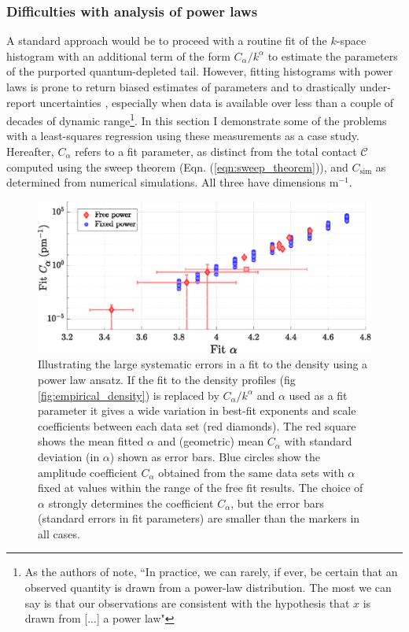 \subsubsection{Difficulties with analysis of power laws}	
\label{sec:pow_issues}

	A standard approach would be to proceed with a routine fit of the $k$-space histogram with an additional term of the form $C_\alpha/k^\alpha$ to estimate the parameters of the purported quantum-depleted tail.
	However, fitting histograms with power laws is prone to return biased estimates of parameters and to drastically under-report uncertainties \cite{Clauset09,Virkar14}, especially when data is available over less than a couple of decades of dynamic range\footnote{As the authors of \cite{Clauset09} note, ``In practice, we can rarely, if ever, be certain that an observed quantity is drawn from a power-law distribution. The most we can say is that our observations are consistent with the hypothesis that $x$ is drawn from [...] a power law"}.
	In this section I demonstrate some of the problems with a least-squares regression using these measurements as a case study.
	Hereafter, $C_\alpha$ refers to a fit parameter, as distinct from the total contact $\mathcal{C}$ computed using the sweep theorem (Eqn. (\ref{eqn:sweep_theorem})), and $C_\textrm{sim}$ as determined from  numerical simulations. All three have dimensions m${}^{-1}$.


    \begin{figure}
       \includegraphics[width=\textwidth]{fig/QD/c_fit_problems}
	        \caption{Illustrating the large systematic errors in a fit to the density using a power law ansatz. If the fit to the density profiles (fig \ref{fig:empirical_density}) is replaced by $C_\alpha/k^\alpha$ and $\alpha$ used as a fit parameter it gives a wide variation in best-fit exponents and scale coefficients between each data set (red diamonds). The red square shows the mean fitted $\alpha$ and (geometric) mean $C_\alpha$ with standard deviation (in $\alpha$) shown as error bars. Blue circles show the amplitude coefficient $C_\alpha$ obtained from the same data sets with $\alpha$ fixed at values within the range of the free fit results. The choice of $\alpha$ strongly determines the coefficient $C_\alpha$, but the error bars (standard errors in fit parameters) are smaller than the markers in all cases. }
	        \label{fig:contact_determination_issues}
	\end{figure}

